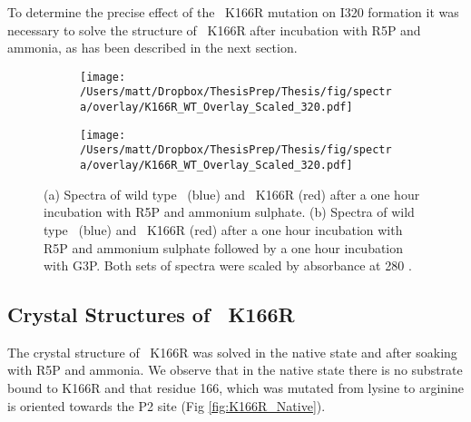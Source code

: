 To determine the precise effect of the \atpdx ~K166R mutation on I320 formation it was necessary to solve the structure of \atpdx ~K166R after incubation with R5P and ammonia, as has been described in the next section.   
\begin{figure}
\centering
\begin{subfigure}{.49\textwidth}
  \centering
  \texttt{[image: /Users/matt/Dropbox/ThesisPrep/Thesis/fig/spectra/overlay/K166R\_WT\_Overlay\_Scaled\_320.pdf]}	
	 
    \caption{\label{fig:Pdx1WT_K166Roverlay_I320}}
 
\end{subfigure}
\begin{subfigure}{.49\textwidth}
  \centering
  \texttt{[image: /Users/matt/Dropbox/ThesisPrep/Thesis/fig/spectra/overlay/K166R\_WT\_Overlay\_Scaled\_320.pdf]}
 
  \caption{\label{fig:Pdx1WT_K166Roverlay_PLP}}
 
\end{subfigure}

\caption[Overlay of wild type and \atpdx ~K166R spectra in solution]{(a) Spectra of wild type \atpdx ~(blue) and \atpdx ~K166R (red) after a one hour incubation with R5P and ammonium sulphate. (b) Spectra of wild type \atpdx ~(blue) and \atpdx ~K166R (red) after a one hour incubation with R5P and ammonium sulphate followed by a one hour incubation with G3P. Both sets of spectra were scaled by absorbance at 280 \nm .\label{fig:Pdx1WT_K166Roverlay}}
\end{figure}

\clearpage
\subsection*{Crystal Structures of \atpdx ~K166R}\label{sec:K166R_320}
\FloatBarrier
The crystal structure of \atpdx ~K166R was solved in the native state and after soaking with R5P and ammonia. We observe that in the native state there is no substrate bound to \atpdx K166R and that residue 166, which was mutated from lysine to arginine is oriented towards the P2 site (Fig \ref{fig:K166R_Native}). 

